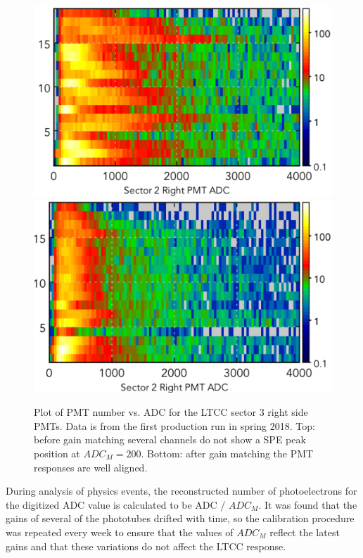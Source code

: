 \begin{figure}[h]
	\centering
	\includegraphics[width=0.99\columnwidth,keepaspectratio]{img/gainMatchingBefore.png}
	\includegraphics[width=0.99\columnwidth,keepaspectratio]{img/gainMatchingAfter.png}
	\caption{Plot of PMT number vs. ADC for the LTCC sector 3 right side PMTs. Data is from the first production
             run in spring 2018. Top: before gain matching several channels do not show a SPE peak position at  $ADC_M = 200$.
             Bottom: after gain matching the PMT responses are well aligned.}
	\label{fig:gainMatching}
\end{figure}

During analysis of physics events, the reconstructed number of photoelectrons for the digitized ADC value is
calculated to be ADC / $ADC_M$. It was found that the gains of several of the phototubes drifted with time, so
the calibration procedure was repeated every week to ensure that the values of $ADC_M$ reflect the latest
gains and that these variations do not affect the LTCC response.
